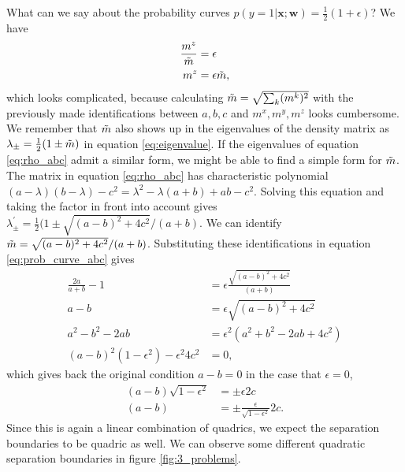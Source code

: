 \noindent What can we say about the probability curves $p(y=1|\mathbf{x};\mathbf{w}) = \frac{1}{2}(1+\epsilon)$? We have
\begin{align}
    \frac{m^z}{\Tilde{m}} &= \epsilon \nonumber\\
    m^z & = \epsilon \Tilde{m},
    \label{eq:prob_curve_abc}
\end{align}
which looks complicated, because calculating  $\Tilde{m} = \sqrt{\sum_k (m^k)^2}$ with the previously made identifications between $a,b,c$ and $m^x, m^y, m^z$ looks cumbersome. We remember that $\Tilde{m}$ also shows up in the eigenvalues of the density matrix as $\lambda_\pm = \frac{1}{2}(1 \pm \Tilde{m})$ in equation \ref{eq:eigenvalue}. If the eigenvalues of equation \ref{eq:rho_abc} admit a similar form, we might be able to find a simple form for $\Tilde{m}$. The matrix in equation \ref{eq:rho_abc} has characteristic polynomial $(a-\lambda)(b-\lambda)-c^2 = \lambda^2 - \lambda(a+b) + ab - c^2$. Solving this equation and taking the factor in front into account gives $\lambda_{\pm}^\prime = \frac{1}{2}(1 \pm \sqrt{(a-b)^2 +4c^2} / (a+b)$. We can identify $\Tilde{m} = \sqrt{(a-b)^2 +4c^2} / (a+b)$. Substituting these identifications in equation \ref{eq:prob_curve_abc} gives
\begin{align*}
    \frac{2a}{a+b} -1 &= \epsilon\frac{\sqrt{(a-b)^2 +4c^2}}{(a+b)}\\
    a-b &= \epsilon \sqrt{(a-b)^2 +4c^2}\\
    a^2 - b^2 - 2ab&= \epsilon^2 (a^2 + b^2 - 2ab +4c^2)\\
    (a - b )^2 (1-\epsilon^2) - \epsilon^2 4c^2 &= 0,
\end{align*}
which gives back the original condition $a-b=0$ in the case that $\epsilon=0$,
\begin{align*}
    (a - b ) \sqrt{1-\epsilon^2} &= \pm\epsilon 2c \\
    (a - b )  &= \pm\frac{\epsilon}{\sqrt{1-\epsilon^2}} 2c.
\end{align*}
Since this is again a linear combination of quadrics, we expect the separation boundaries to be quadric as well. We can observe some different quadratic separation boundaries in figure \ref{fig:3_problems}.

